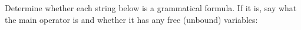 %
%
%
%


\practiceproblems
\problempart Determine whether each string below is a grammatical formula.  If it is, say what the main operator is and whether it has any free (unbound) variables:

